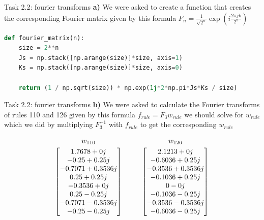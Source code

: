 \documentclass[aspectratio=169]{beamer}
\begin{document}
\begin{frame}[fragile]{Task 2.2: fourier transforms}
\textbf{a)} We were asked to create a function that creates the corresponding Fourier matrix given by this formula $F_n = \frac{1}{\sqrt{2^n}} \exp\left(i \frac{2 \pi j k}{2^n}\right)$
\begin{lstlisting}[language=Python]
def fourier_matrix(n):
    size = 2**n
    Js = np.stack([np.arange(size)]*size, axis=1)
    Ks = np.stack([np.arange(size)]*size, axis=0)

    return (1 / np.sqrt(size)) * np.exp(1j*2*np.pi*Js*Ks / size)
\end{lstlisting}
\end{frame}

\begin{frame}[fragile]{Task 2.2: fourier transforms}
\textbf{b)} We were asked to calculate the Fourier transforms of rules 110 and 126 given by this formula $f_{rule} = F_3 w_{rule}$ we should solve for $w_{rule}$ which we did by multiplying $F_3^{-1}$ with $f_{rule}$ to get the corresponding $w_{rule}$

\[
\begin{array}{c@{\hspace{1cm}}c}  %
    \text{$w_{110}$} & \text{$w_{126}$} \\[0.3em] %
    \begin{bmatrix}
         1.7678 + 0j \\
        -0.25 + 0.25j \\
        -0.7071 + 0.3536j \\
         0.25 + 0.25j \\
        -0.3536 + 0j \\
         0.25 - 0.25j \\
        -0.7071 - 0.3536j \\
        -0.25 - 0.25j
    \end{bmatrix}
    &
    \begin{bmatrix}
         2.1213 + 0j \\
        -0.6036 + 0.25j \\
        -0.3536 + 0.3536j \\
        -0.1036 + 0.25j \\
         0 - 0j \\
        -0.1036 - 0.25j \\
        -0.3536 - 0.3536j \\
        -0.6036 - 0.25j
    \end{bmatrix}
\end{array}
\]

\end{frame}
\end{document}
